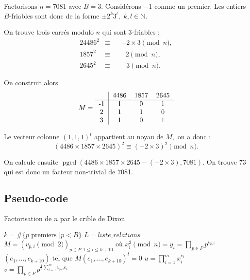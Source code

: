 \documentclass[french, 12pt, titlepage]{article}
\DeclareMathOperator{\pgcd}{pgcd}
\newcommand{\N}{\mathbb{N}}
\begin{document}
Factorisons $n = 7081$ avec $B = 3.$ Considérons $-1$ comme un
premier. Les entiers $B$-friables sont donc de la forme $\pm2^k3^l,$
$k, l \in \N.$ 

On trouve trois carrés modulo $n$ qui sont 3-friables :
\begin{alignat*}{2}
4486^2 & \equiv && -\!2 \times 3 \pmod n, \\
1857^2 & \equiv && \text{ } 2 \pmod n, \\
2645^2 & \equiv && -\!3 \pmod n.
\end{alignat*}

On construit alors \[M = \begin{tabular}{c|ccc}
                            & 4486 & 1857 & 2645 \\
                           \hline
                           -1 & 1 & 0 & 1 \\
                           2 & 1 & 1 & 0 \\
                           3 & 1 & 0 & 1 \\
                         \end{tabular}\]

Le vecteur colonne $(1, 1, 1)^t$ appartient au noyau de $M,$ on a donc
: \[(4486 \times 1857 \times 2645)^2 \equiv (-2 \times 3)^2 \pmod
n.\]

On calcule ensuite $\pgcd(4486 \times 1857 \times 2645 - (-2 \times
3), 7081).$ On trouve 73 qui est donc un facteur non-trivial de 7081.

\subsection{Pseudo-code}

\begin{algorithm}
\caption{Factorisation de $n$ par le crible de Dixon}
\BlankLine
$k = \#\{p \text{ premiers } | p < B\}$\;
$L = liste\_relations$\;
$M = (v_{p, i} \pmod 2)_{p \in P, 1 \leq i \leq k + 10} \text{ où } x_i^2 \pmod n = y_i = \prod\limits_{p \in P}p^{v_{p,i}}$\;
$(e_1, ..., e_{k + 10}) \text{ tel que } M(e_1, ..., e_{k + 10})^t = 0$\;
$u = \prod\limits_{i = 1}^m x_i^{e_i}$\;
$v = \prod\limits_{p \in P} p^{\frac{1}{2} \sum\limits_{i=1}^m v_{p, i}e_i}$\;
\Return{$\pgcd(u - v, n)$}
\end{algorithm}
\end{document}

